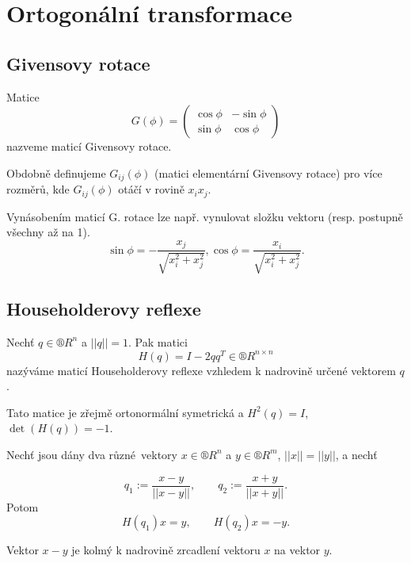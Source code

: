 \documentclass[12pt]{article}					%
\begin{document}
\section{Ortogonální transformace}
	\subsection{Givensovy rotace}
	\begin{definice}
		Matice
		$$ G(\phi) = \begin{pmatrix} \cos \phi & -\sin \phi \\ \sin \phi & \cos \phi \end{pmatrix} $$
		nazveme maticí Givensovy rotace.

		Obdobně definujeme $G_{ij}(\phi)$ (matici elementární Givensovy rotace) pro více rozměrů, kde $G_{ij}(\phi)$ otáčí v rovině $x_ix_j$.
	\end{definice}

	\begin{poznamka}
		Vynásobením maticí G. rotace lze např. vynulovat složku vektoru (resp. postupně všechny až na 1).
		$$ \sin\phi = -\frac{x_j}{\sqrt{x_i^2 + x_j^2}}, \cos\phi = \frac{x_i}{\sqrt{x_i^2 + x_j^2}}. $$
	\end{poznamka}

	\subsection{Householderovy reflexe}
	\begin{definice}
		Nechť $q \in ®R^n$ a $||q|| = 1$. Pak matici
		$$ H(q) = I - 2qq^T \in ®R^{n \times n} $$
		nazýváme maticí Householderovy reflexe vzhledem k nadrovině určené vektorem $q$.

		\begin{poznamkain}
			Tato matice je zřejmě ortonormální symetrická a $H^2(q) = I$, $\det(H(q)) = -1$.
		\end{poznamkain}
	\end{definice}

	\begin{veta}[O zrcadlení]
		Nechť jsou dány dva různé vektory $x \in ®R^n$ a $y \in ®R^m$, $||x|| = ||y||$, a nechť

		$$ q_1 := \frac{x - y}{||x - y||}, \qquad q_2 := \frac{x + y}{||x + y||}. $$
		Potom
		$$ H(q_1)x = y, \qquad H(q_2)x = -y. $$

		\begin{dukazin}
			Vektor $x - y$ je kolmý k nadrovině zrcadlení vektoru $x$ na vektor $y$.
		\end{dukazin}
	\end{veta}
\end{document}
